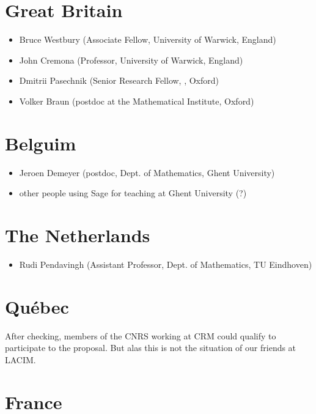 \section*{Great Britain}

\begin{itemize}
\item Bruce Westbury (Associate Fellow, University of Warwick, England)
\item John Cremona (Professor, University of Warwick, England)
\item Dmitrii Pasechnik (Senior Research Fellow, \CS, Oxford)
\item Volker Braun (postdoc at the Mathematical Institute, Oxford)
\end{itemize}

\section{Belguim}

\begin{itemize}
\item Jeroen Demeyer (postdoc, Dept. of Mathematics, Ghent University)
\item other people using Sage for teaching at Ghent University (?)
\end{itemize}

\section{The Netherlands}

\begin{itemize}
\item Rudi Pendavingh (Assistant Professor, Dept. of Mathematics, TU Eindhoven)
\end{itemize}

\section*{Québec}

After checking, members of the CNRS working at CRM could qualify to
participate to the proposal. But alas this is not the situation of our
friends at LACIM.

\section*{France}

